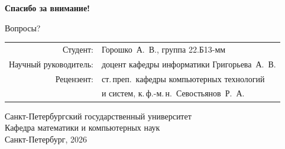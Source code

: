 \documentclass[aspectratio=169]{beamer}
\begin{document}
{
\begin{frame}
\begin{center}
{\LARGE \textbf{Спасибо за внимание!}}

\bigskip
{\large Вопросы?}

\bigskip\bigskip
\begin{tabular}{rl}
Студент: & Горошко~А.~В., группа 22.Б13-мм \\
Научный руководитель: & доцент кафедры информатики Григорьева~А.~В. \\
Рецензент: & ст.\,преп.\ кафедры компьютерных технологий\\
 & и систем, к.\,ф.-м.\,н.\ Севостьянов~Р.~А. \\
\end{tabular}

\bigskip
{\scriptsize Санкт-Петербургский государственный университет\\
Кафедра математики и компьютерных наук\\
Санкт-Петербург, 2026}
\end{center}
\end{frame}
}
\end{document}
